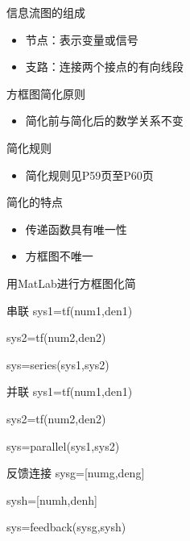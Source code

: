  \begin{frame}
 \begin{block}{信息流图的组成}
 \begin{itemize}[<+->]
 \item 节点：表示变量或信号
 \item 支路：连接两个接点的有向线段
 \end{itemize}
 \end{block}
 \begin{block}{方框图简化原则}
 \begin{itemize}
 \item 简化前与简化后的数学关系不变
 \end{itemize}
 \end{block}
 \begin{block}{简化规则}
 \begin{itemize}
 \item 简化规则见P59页至P60页
 \end{itemize}
 \end{block}
 \end{frame}
 \begin{frame}
 \begin{block}{简化的特点}
 \begin{itemize}
 \item 传递函数具有唯一性
 \item 方框图不唯一
 \end{itemize}
 \end{block}
 \end{frame}
 \begin{frame}{用MatLab进行方框图化简}
 \begin{block}{串联}
 sys1=tf(num1,den1)
 
 sys2=tf(num2,den2)
 
 sys=series(sys1,sys2)
 \end{block}
 \begin{block}{并联}
 sys1=tf(num1,den1)
 
 sys2=tf(num2,den2)
 
 sys=parallel(sys1,sys2)
 \end{block}
 \end{frame}
 \begin{frame}
 \begin{block}{反馈连接}
sysg=[numg,deng]

sysh=[numh,denh]

sys=feedback(sysg,sysh)
 \end{block}
 \end{frame}
